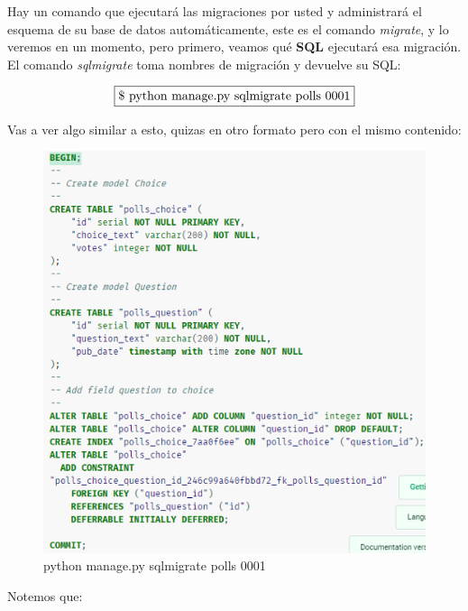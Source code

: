 \documentclass[10pt]{article}
\begin{document}
Hay un comando que ejecutará las migraciones por usted y administrará el esquema de su base de datos automáticamente, este es el comando \textit{migrate}, y lo veremos en un momento, pero primero, veamos qué \textbf{SQL} ejecutará esa migración. El comando \textit{sqlmigrate} toma nombres de migración y devuelve su SQL:

$$\fbox{\$ python manage.py sqlmigrate polls 0001}$$

Vas a ver algo similar a esto, quizas en otro formato pero con el mismo contenido:


\begin{figure}[H]
\begin{center}
\includegraphics[scale=0.7]{figuras/3/32/323/img3.png}
\renewcommand{\arraystretch}{1.3}
\caption{python manage.py sqlmigrate polls 0001}
\end{center}
\end{figure}

Notemos que:
\end{document}
